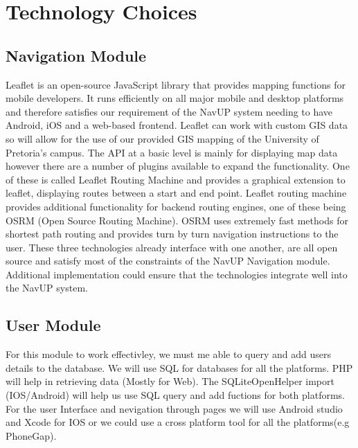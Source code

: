 \documentclass[11pt]{article}
\begin{document}
\section{Technology Choices}

\subsection{Navigation Module}
Leaflet is an open-source JavaScript library that provides mapping functions for mobile developers. It runs efficiently on all major mobile and desktop platforms and therefore satisfies our requirement of the NavUP system needing to have Android, iOS and a web-based frontend. Leaflet can work with custom GIS data so will allow for the use of our provided GIS mapping of the University of Pretoria’s campus. The API at a basic level is mainly for displaying map data however there are a number of plugins available to expand the functionality. One of these is called Leaflet Routing Machine and provides a graphical extension to leaflet, displaying routes between a start and end point. Leaflet routing machine provides additional functionality for backend routing engines, one of these being OSRM (Open Source Routing Machine). OSRM uses extremely fast methods for shortest path routing and provides turn by turn navigation instructions to the user. These three technologies already interface with one another, are all open source and satisfy most of the constraints of the NavUP Navigation module. Additional implementation could ensure that the technologies integrate well into the NavUP system.

\subsection{User Module}
For this module to work effectivley, we must me able to query and add users details to the database. We will use SQL for databases for all the platforms. PHP will help in retrieving data (Mostly for Web). The SQLiteOpenHelper import (IOS/Android) will help us use SQL query and add fuctions for both platforms.
For the user Interface and nevigation through pages we will use Android studio and Xcode for IOS or we could use a cross platform tool for all the platforms(e.g PhoneGap). 
\end{document}
